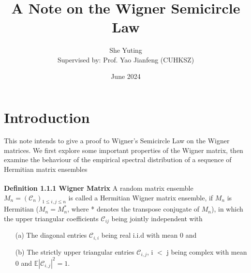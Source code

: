 \documentclass{article}
\title{A Note on the Wigner Semicircle Law}
\author[1]{She Yuting \\
Supervised by: Prof. Yao Jianfeng (CUHKSZ)}
\date{June 2024}
\begin{document}
\maketitle
\section{Introduction}
This note intends to give a proof to Wigner's Semicircle Law on the Wigner matrices. We first explore some important properties of the Wigner matrix, then examine the behaviour of the empirical spectral distribution of a sequence of Hermitian matrix ensembles\\
\\
\textbf{Definition 1.1.1 Wigner Matrix}
 A random matrix ensemble $M_n = (\mathcal{C}_n)_{1 \leq i,j \leq n}$ is called a Hermitian Wigner matrix ensemble, if $M_n$ is Hermitian ($M_n = M_n^{*}$, where * denotes the transpose conjugate of $M_n$), in which the upper triangular coefficients $\mathcal{C}_{ij}$ being jointly independent with
 \begin{itemize}
     \item[(a)] The diagonal entries $\mathcal{C}_{i,i}$ being real i.i.d with mean 0 and
     \item[(b)] The strictly upper triangular entries $\mathcal{C}_{i, j}$, i $<$ j being complex with mean 0 and $\mathbb{E}|\mathcal{C}_{i,j}|^2 = 1$.
 \end{itemize}
 
\end{document}
